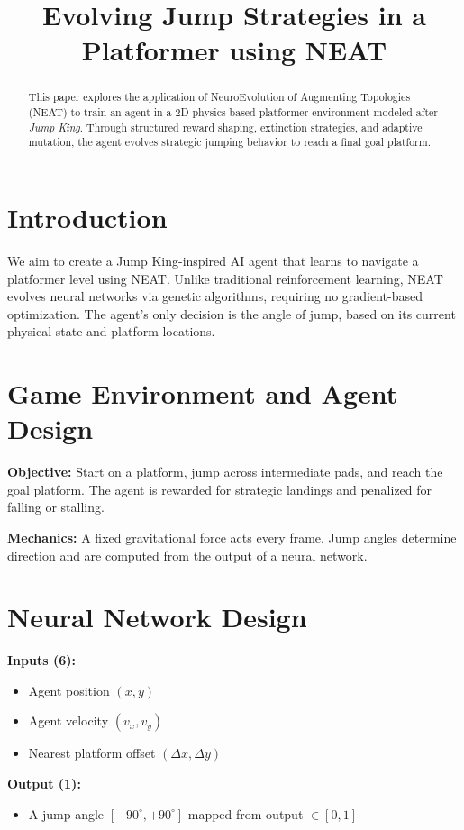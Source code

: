 \documentclass[10pt,conference]{IEEEtran}
\title{Evolving Jump Strategies in a Platformer using NEAT}
\author{\IEEEauthorblockN{Swapnil}
\IEEEauthorblockA{AI \& Game Intelligence Lab, 2025\\
Email: swapnil@example.com}}
\begin{document}
\maketitle

\begin{abstract}
This paper explores the application of NeuroEvolution of Augmenting Topologies (NEAT) to train an agent in a 2D physics-based platformer environment modeled after \textit{Jump King}. Through structured reward shaping, extinction strategies, and adaptive mutation, the agent evolves strategic jumping behavior to reach a final goal platform.
\end{abstract}

\section{Introduction}
We aim to create a Jump King-inspired AI agent that learns to navigate a platformer level using NEAT. Unlike traditional reinforcement learning, NEAT evolves neural networks via genetic algorithms, requiring no gradient-based optimization. The agent's only decision is the angle of jump, based on its current physical state and platform locations.

\section{Game Environment and Agent Design}
\textbf{Objective:} Start on a platform, jump across intermediate pads, and reach the goal platform. The agent is rewarded for strategic landings and penalized for falling or stalling.

\textbf{Mechanics:} A fixed gravitational force acts every frame. Jump angles determine direction and are computed from the output of a neural network.

\section{Neural Network Design}
\textbf{Inputs (6):}
\begin{itemize}
    \item Agent position $(x, y)$
    \item Agent velocity $(v_x, v_y)$
    \item Nearest platform offset $(\Delta x, \Delta y)$
\end{itemize}

\textbf{Output (1):}
\begin{itemize}
    \item A jump angle $[-90^\circ, +90^\circ]$ mapped from output $\in [0,1]$
\end{itemize}
\end{document}
